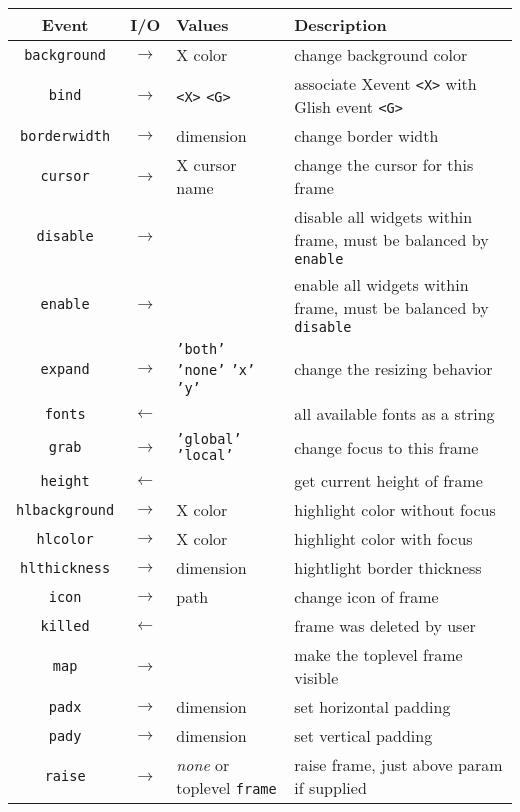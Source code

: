 \begin{table}[tbh]
{\small
\begin{center}
\begin{tabular}{|c|c|p{1.6in}|p{1.9in}|}
\hline
Event & I/O & Values & Description \\
\hline
\hline
{\tt background}&$\rightarrow$& X color & change background color \\ \hline
{\tt bind}	&$\rightarrow$&\verb+<X>+ \verb+<G>+& associate Xevent \verb+<X>+ with Glish event \verb+<G>+ \\ \hline
{\tt borderwidth}&$\rightarrow$& dimension & change border width \\ \hline
{\tt cursor}    &$\rightarrow$& X cursor name & change the cursor for this frame\\ \hline
{\tt disable}&$\rightarrow$& & disable all widgets within frame, must be balanced by {\tt enable} \\ \hline
{\tt enable}&$\rightarrow$& & enable all widgets within frame, must be balanced by {\tt disable} \\ \hline
{\tt expand}    &$\rightarrow$& {\tt 'both'} {\tt 'none'} {\tt 'x'} {\tt 'y'} & change the resizing behavior \\ \hline
{\tt fonts}&$\leftarrow$& & all available fonts as a string \\ \hline
{\tt grab}      &$\rightarrow$& {\tt 'global'} {\tt 'local'} & change focus to this frame \\ \hline
{\tt height}    &$\leftarrow$& & get current height of frame \\ \hline
{\tt hlbackground}&$\rightarrow$& X color & highlight color without focus \\ \hline
{\tt hlcolor}	&$\rightarrow$& X color & highlight color with focus \\ \hline
{\tt hlthickness}&$\rightarrow$& dimension & hightlight border thickness \\ \hline
{\tt icon}&$\rightarrow$& path & change icon of frame \\ \hline
{\tt killed}    &$\leftarrow$& & frame was deleted by user \\ \hline
{\tt map}&$\rightarrow$& & make the toplevel frame visible \\ \hline
{\tt padx}      &$\rightarrow$& dimension & set horizontal padding \\ \hline
{\tt pady}      &$\rightarrow$& dimension & set vertical padding \\ \hline
{\tt raise}     &$\rightarrow$& {\em none} or toplevel {\tt frame} & raise frame, just above param if supplied \\ \hline

\end{tabular}
\end{center}}
\end{table}
